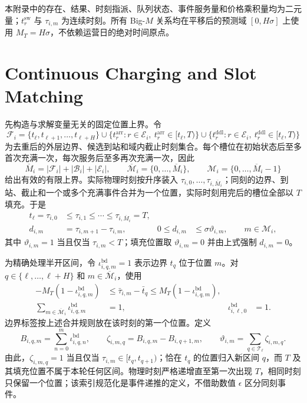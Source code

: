 \documentclass[12pt,a4paper,UTF8]{ctexart}
\begin{document}
本附录中的存在、结果、时刻指派、队列状态、事件服务量和价格乘积量均为二元量；$t_r^{\mathrm{sw}}$ 与 $\tau_{i,m}$ 为连续时刻。所有 Big-$M$ 关系均在平移后的预测域 $[0,H\sigma]$ 上使用 $M_T=H\sigma$，不依赖运营日的绝对时间原点。

\section{Continuous Charging and Slot Matching}
\label{app:charging}

先构造与求解变量无关的固定位置上界。令
\[
\mathcal F_i=\{t_\ell,t_{\ell+1},\ldots,t_{\ell+H}\}
\cup\{t_r^{\mathrm{arr}}:
r\in\mathcal E_i,\ t_r^{\mathrm{arr}}\in[t_\ell,T)\}
\cup\{t_r^{\mathrm{ddl}}:
r\in\mathcal E_i,\ t_r^{\mathrm{ddl}}\in[t_\ell,T)\}
\]
为去重后的外层边界、候选到站和域内截止时刻集合。每个槽位在初始状态后至多首次充满一次，每次服务后至多再次充满一次，因此
\[
\overline M_i=|\mathcal F_i|+|\mathcal B_i|+|\mathcal E_i|,
\qquad
\overline{\mathcal M}_i=\{0,\ldots,\overline M_i\},
\qquad
\mathcal M_i=\{0,\ldots,\overline M_i-1\}
\]
给出有效的有限上界。实际物理时刻按升序装入
$\tau_{i,0},\ldots,\tau_{i,\overline M_i}$；同刻的边界、到站、截止和一个或多个充满事件合并为一个位置，实际时刻用完后的槽位全部以 $T$ 填充。于是
\begin{subequations}
\label{eq:event_position_grid}
\begin{align}
t_\ell=\tau_{i,0}
&\le\tau_{i,1}\le\cdots
\le\tau_{i,\overline M_i}=T,\\
d_{i,m}&=\tau_{i,m+1}-\tau_{i,m},&
0\le d_{i,m}&\le\sigma\vartheta_{i,m},
\qquad m\in\mathcal M_i,
\end{align}
\end{subequations}
其中 $\vartheta_{i,m}=1$ 当且仅当 $\tau_{i,m}<T$；填充位置取 $\vartheta_{i,m}=0$ 并由上式强制 $d_{i,m}=0$。

为精确处理半开区间，令
$\iota_{i,q,m}^{\mathrm{bd}}=1$ 表示边界 $t_q$ 位于位置 $m$。对
$q\in\{\ell,\ldots,\ell+H\}$ 和
$m\in\overline{\mathcal M}_i$，使用
\begin{subequations}
\label{eq:boundary_position_assignment}
\begin{align}
-M_T(1-\iota_{i,q,m}^{\mathrm{bd}})
&\le\bar\tau_{i,m}-\bar t_q
\le M_T(1-\iota_{i,q,m}^{\mathrm{bd}}),\\
\sum_{m\in\overline{\mathcal M}_i}
\iota_{i,q,m}^{\mathrm{bd}}&=1,
&\iota_{i,\ell,0}^{\mathrm{bd}}&=1.
\end{align}
\end{subequations}
边界标签按上述合并规则放在该时刻的第一个位置。定义
\begin{equation}
B_{i,q,m}=\sum_{n=0}^{m}\iota_{i,q,n}^{\mathrm{bd}},
\qquad
\zeta_{i,m,q}=B_{i,q,m}-B_{i,q+1,m},
\qquad
\vartheta_{i,m}=\sum_{q\in\mathcal T_\ell}\zeta_{i,m,q}.
\label{eq:boundary_interval_affiliation}
\end{equation}
由此，$\zeta_{i,m,q}=1$ 当且仅当
$\tau_{i,m}\in[t_q,t_{q+1})$；恰在 $t_q$ 的位置归入新区间 $q$，而 $T$ 及其填充位置不属于本轮任何区间。物理时刻严格递增直至第一次出现 $T$，相同时刻只保留一个位置；该索引规范化是事件递推的定义，不借助数值 $\epsilon$ 区分同刻事件。
\end{document}
